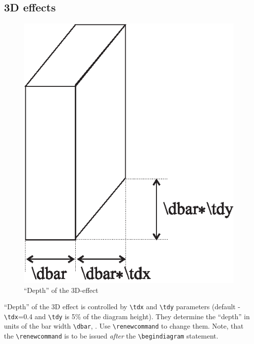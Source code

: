 \documentclass[12pt]{article}
\begin{document}
\subsection{3D effects \label{sec:3.5}}
\begin{figure}[!h]\centering
  \includegraphics[scale=0.7]{figs/tddiag.eps}
\caption{\label{fig:3d}``Depth'' of the 3D-effect}
\end{figure}
 ``Depth'' of the 3D effect is controlled by \verb+\tdx+ and
 \verb+\tdy+ parameters 
  
 (default - \verb+\tdx+=0.4 and \verb+\tdy+ is 5\% of the diagram height). 
 They determine the
 ``depth'' in units of the bar width \verb+\dbar+, .
 Use \verb+\renewcommand+ to change them. Note, that the \verb+\renewcommand+
 is to be issued \emph{after} the \verb+\begindiagram+ statement.


\printindex
\end{document}
